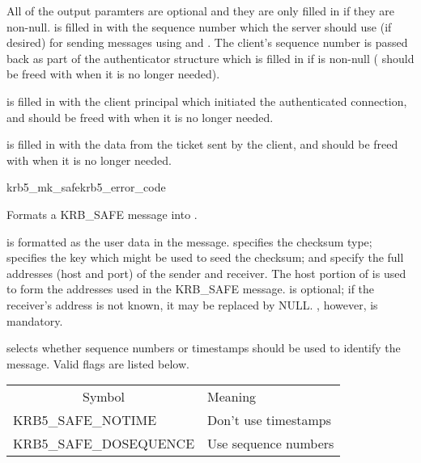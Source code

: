 All of the output paramters are optional and they are only filled in
if they are non-null.   is filled in with the
sequence number which the server should use (if desired) for sending
messages using  and
.   The client's sequence number is passed back
as part of the authenticator structure which is filled in if
 is non-null ( should be freed
with  when it is no longer needed).

 is filled in with the client principal which
initiated the authenticated connection, and should be freed with
 when it is no longer needed.

 is filled in with the data from the ticket sent by
the client, and should be freed with  when
it is no longer needed.

\begin{funcdecl}{krb5_mk_safe}{krb5_error_code}{\funcin}
\funcout
{}
\end{funcdecl}

Formats a KRB_SAFE message into .

 is formatted as the user data in the message.
 specifies the checksum type; 
specifies the key which might be used to seed the checksum;
 and  specify the full
addresses (host and port) of the sender and receiver.  The host
portion of  is used to form the addresses used
in the KRB_SAFE message.   is optional; if the
receiver's address is not known, it may be replaced by NULL.
, however, is mandatory.

 selects whether sequence numbers or timestamps
should be used to identify the message.  Valid flags are listed below.

\begin{tabular}{ll}
\multicolumn{1}{c}{Symbol} & Meaning \\
KRB5_SAFE_NOTIME		& Don't use timestamps \\
KRB5_SAFE_DOSEQUENCE	& Use sequence numbers \\
\end{tabular}

